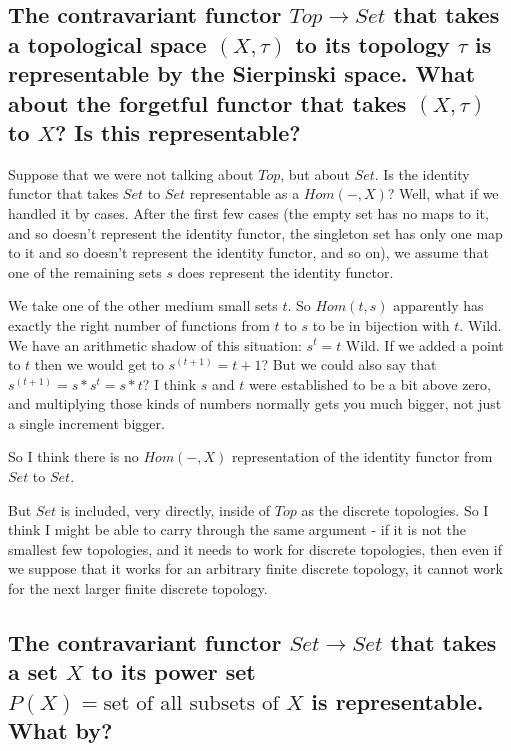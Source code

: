 \documentclass{proc-l}
\theoremstyle{definition}
\theoremstyle{remark}
\numberwithin{equation}{section}
\begin{document}


\subsection{The contravariant functor $Top \rightarrow Set$ that takes a topological space $(X,\tau)$ to its topology $\tau$ is representable by the Sierpinski space. What about the forgetful functor that takes $(X,\tau)$ to $X$? Is this representable?}



Suppose that we were not talking about $Top$, but about $Set$. Is the identity functor that takes $Set$ to $Set$ representable as a $Hom(-, X)$? Well, what if we handled it by cases. After the first
few cases (the empty set has no maps to it, and so doesn't represent the identity functor, the singleton set has only one map to it and so doesn't represent the identity functor, and so on),
we assume that one of the remaining sets $s$ does represent the identity functor.

We take one of the other medium small sets $t$. So $Hom(t, s)$ apparently has exactly the right
number of functions from $t$ to $s$ to be in bijection with $t$. Wild.
We have an arithmetic shadow of this situation: $s^t = t$ Wild.
If we added a point to $t$ then we would get to $s^(t+1) = t+1$?
But we could also say that $s^(t+1) = s * s^t = s * t$?
I think $s$ and $t$ were established to be a bit above zero, and multiplying those kinds of numbers
normally gets you much bigger, not just a single increment bigger.

So I think there is no $Hom(-, X)$ representation of the identity functor from $Set$ to $Set$.

But $Set$ is included, very directly, inside of $Top$ as the discrete topologies. So I think I might be able to carry through the same argument - if it is not the smallest few topologies, and it needs to work for discrete topologies, then even if we suppose that it works for an
arbitrary finite discrete topology, it cannot work for the next larger finite discrete topology.

\subsection*{The contravariant functor $Set \rightarrow Set$ that takes a set $X$ to its power set $P(X) = {\text{set of all subsets of $X$}}$ is representable. What by? }
\end{document}
